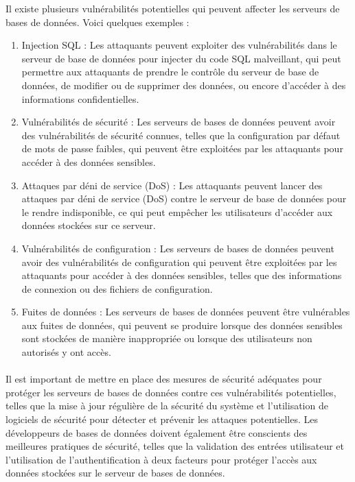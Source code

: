 Il existe plusieurs vulnérabilités potentielles qui peuvent affecter les serveurs de bases de données. Voici quelques exemples :
\begin{enumerate}



	\item   Injection SQL : Les attaquants peuvent exploiter des vulnérabilités dans le serveur de base de données pour injecter du code SQL malveillant, qui peut permettre aux attaquants de prendre le contrôle du serveur de base de données, de modifier ou de supprimer des données, ou encore d'accéder à des informations confidentielles.
	
	\item   Vulnérabilités de sécurité : Les serveurs de bases de données peuvent avoir des vulnérabilités de sécurité connues, telles que la configuration par défaut de mots de passe faibles, qui peuvent être exploitées par les attaquants pour accéder à des données sensibles.
	
	\item   Attaques par déni de service (DoS) : Les attaquants peuvent lancer des attaques par déni de service (DoS) contre le serveur de base de données pour le rendre indisponible, ce qui peut empêcher les utilisateurs d'accéder aux données stockées sur ce serveur.
	
	\item   Vulnérabilités de configuration : Les serveurs de bases de données peuvent avoir des vulnérabilités de configuration qui peuvent être exploitées par les attaquants pour accéder à des données sensibles, telles que des informations de connexion ou des fichiers de configuration.
	
	\item   Fuites de données : Les serveurs de bases de données peuvent être vulnérables aux fuites de données, qui peuvent se produire lorsque des données sensibles sont stockées de manière inappropriée ou lorsque des utilisateurs non autorisés y ont accès.
\end{enumerate}
\paragraph{ }

Il est important de mettre en place des mesures de sécurité adéquates pour protéger les serveurs de bases de données contre ces vulnérabilités potentielles, telles que la mise à jour régulière de la sécurité du système et l'utilisation de logiciels de sécurité pour détecter et prévenir les attaques potentielles. Les développeurs de bases de données doivent également être conscients des meilleures pratiques de sécurité, telles que la validation des entrées utilisateur et l'utilisation de l'authentification à deux facteurs pour protéger l'accès aux données stockées sur le serveur de bases de données.

